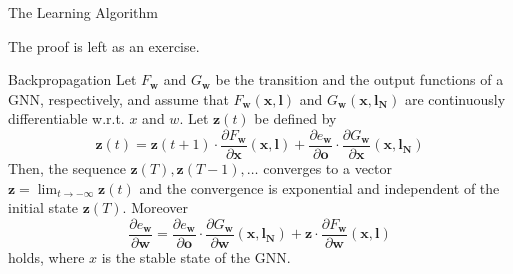 \documentclass[10pt,aspectratio=169]{beamer}
\begin{document}
\begin{frame}[allowframebreaks]{The Learning Algorithm}
\begin{tiny}
    The proof is left as an exercise.
\end{tiny}

\begin{theorem}{Backpropagation}
Let $F_{\boldsymbol{w}}$ and $G_{\boldsymbol{w}}$ be the transition and the output functions of a GNN, respectively, and assume that $F_{\boldsymbol{w}}(\boldsymbol{x}, \boldsymbol{l})$ and $G_{\boldsymbol{w}}\left(\boldsymbol{x}, \boldsymbol{l}_{\boldsymbol{N}}\right)$ are continuously differentiable w.r.t. $x$ and $w$. Let $\boldsymbol{z}(t)$ be defined by
\begin{equation}
    \boldsymbol{z}(t)=\boldsymbol{z}(t+1) \cdot \frac{\partial F_{\boldsymbol{w}}}{\partial \boldsymbol{x}}(\boldsymbol{x}, \boldsymbol{l})+\frac{\partial e_{\boldsymbol{w}}}{\partial \boldsymbol{o}} \cdot \frac{\partial G_{\boldsymbol{w}}}{\partial \boldsymbol{x}}\left(\boldsymbol{x}, \boldsymbol{l}_{\boldsymbol{N}}\right)        
\end{equation}
Then, the sequence $\boldsymbol{z}(T), \boldsymbol{z}(T-1), \ldots$ converges to a vector $\boldsymbol{z}=\lim _{t \rightarrow-\infty} \boldsymbol{z}(t)$ and the convergence is exponential and independent of the initial state $\boldsymbol{z}(T) .$ Moreover
\begin{equation}
    \frac{\partial e_{\boldsymbol{w}}}{\partial \boldsymbol{w}}=\frac{\partial e_{\boldsymbol{w}}}{\partial \boldsymbol{o}} \cdot \frac{\partial G_{\boldsymbol{w}}}{\partial \boldsymbol{w}}\left(\boldsymbol{x}, \boldsymbol{l}_{\boldsymbol{N}}\right)+\boldsymbol{z} \cdot \frac{\partial F_{\boldsymbol{w}}}{\partial \boldsymbol{w}}(\boldsymbol{x}, \boldsymbol{l})    
\end{equation}
holds, where $x$ is the stable state of the GNN.
\end{theorem}



\end{frame}
\end{document}

